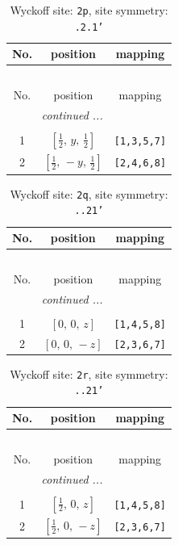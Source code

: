 \documentclass[fleqn,8pt]{jsarticle}
\begin{document}
\begin{longtable}{ccc}
\caption{Wyckoff site: {\tt 2p}, site symmetry: {\tt .2.1'}}
 \\
 \hline \hline
No. & position & mapping \\ \hline \endfirsthead

\multicolumn{2}{l}{\tablename\ \thetable{}} \\
 \hline \hline
No. & position & mapping \\ \hline \endhead

 \hline \hline
\multicolumn{2}{r}{\footnotesize\it continued ...} \\ \endfoot

 \hline \hline
\multicolumn{2}{r}{} \\ \endlastfoot

1 & $\left[ \frac{1}{2},\, y,\, \frac{1}{2} \right]$ & {\tt [1,3,5,7]} \\ \hline
2 & $\left[ \frac{1}{2},\, - y,\, \frac{1}{2} \right]$ & {\tt [2,4,6,8]} \\
\end{longtable}
\renewcommand{\arraystretch}{1.2}
\begin{longtable}{ccc}
\caption{Wyckoff site: {\tt 2q}, site symmetry: {\tt ..21'}}
 \\
 \hline \hline
No. & position & mapping \\ \hline \endfirsthead

\multicolumn{2}{l}{\tablename\ \thetable{}} \\
 \hline \hline
No. & position & mapping \\ \hline \endhead

 \hline \hline
\multicolumn{2}{r}{\footnotesize\it continued ...} \\ \endfoot

 \hline \hline
\multicolumn{2}{r}{} \\ \endlastfoot

1 & $\left[ 0,\, 0,\, z \right]$ & {\tt [1,4,5,8]} \\ \hline
2 & $\left[ 0,\, 0,\, - z \right]$ & {\tt [2,3,6,7]} \\
\end{longtable}
\renewcommand{\arraystretch}{1.2}
\begin{longtable}{ccc}
\caption{Wyckoff site: {\tt 2r}, site symmetry: {\tt ..21'}}
 \\
 \hline \hline
No. & position & mapping \\ \hline \endfirsthead

\multicolumn{2}{l}{\tablename\ \thetable{}} \\
 \hline \hline
No. & position & mapping \\ \hline \endhead

 \hline \hline
\multicolumn{2}{r}{\footnotesize\it continued ...} \\ \endfoot

 \hline \hline
\multicolumn{2}{r}{} \\ \endlastfoot

1 & $\left[ \frac{1}{2},\, 0,\, z \right]$ & {\tt [1,4,5,8]} \\ \hline
2 & $\left[ \frac{1}{2},\, 0,\, - z \right]$ & {\tt [2,3,6,7]} \\
\end{longtable}
\end{document}
